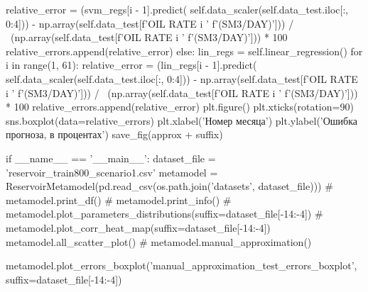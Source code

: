 \begin{pythoncode}
                relative_error = (svm_regs[i - 1].predict(
                    self.data_scaler(self.data_test.iloc[:, 0:4])) -
                                  np.array(self.data_test[f'OIL RATE {i} '
                                                          f'(SM3/DAY)'])) / \
                                 (np.array(self.data_test[f'OIL RATE {i} '
                                                          f'(SM3/DAY)'])) * 100
                relative_errors.append(relative_error)
        else:
            lin_regs = self.linear_regression()
            for i in range(1, 61):
                relative_error = (lin_regs[i - 1].predict(
                    self.data_scaler(self.data_test.iloc[:, 0:4])) -
                                  np.array(self.data_test[f'OIL RATE {i} '
                                                          f'(SM3/DAY)'])) / \
                                 (np.array(self.data_test[f'OIL RATE {i} '
                                                          f'(SM3/DAY)'])) * 100
                relative_errors.append(relative_error)
        plt.figure()
        plt.xticks(rotation=90)
        sns.boxplot(data=relative_errors)
        plt.xlabel('Номер месяца')
        plt.ylabel('Ошибка прогноза, в процентах')
        save_fig(approx + suffix)


if __name__ == '__main__':
    dataset_file = 'reservoir_train800_scenario1.csv'
    metamodel = ReservoirMetamodel(pd.read_csv(os.path.join('datasets',
                                                            dataset_file)))
    # metamodel.print_df()
    # metamodel.print_info()
    # metamodel.plot_parameters_distributions(suffix=dataset_file[-14:-4])
    # metamodel.plot_corr_heat_map(suffix=dataset_file[-14:-4])
    metamodel.all_scatter_plot()
    # metamodel.manual_approximation()

    metamodel.plot_errors_boxplot('manual_approximation_test_errors_boxplot',
                                  suffix=dataset_file[-14:-4])

\end{pythoncode}
